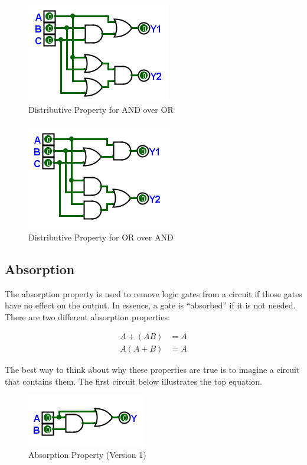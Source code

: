 \begin{figure}[H]
	\centering
	\includegraphics[width=\maxwidth{.95\linewidth}]{gfx/04_23}
	\caption{Distributive Property for AND over OR}
	\label{fig:04_23}
\end{figure}

\begin{figure}[H]
	\centering
	\includegraphics[width=\maxwidth{.95\linewidth}]{gfx/04_24}
	\caption{Distributive Property for OR over AND}
	\label{fig:04_24}
\end{figure}

\subsection{Absorption}
\label{BF:subsec:absorption_property}

The absorption property is used to remove logic gates from a circuit if those gates have no effect on the output. In essence, a gate is ``absorbed'' if it is not needed. There are two different absorption properties:

\begin{align}
  \label{BF:eq:absorption}
  A + (AB) &= A \\
  \nonumber
  A(A + B) &= A
\end{align}

The best way to think about why these properties are true is to imagine a circuit that contains them. The first circuit below illustrates the top equation. 

\begin{figure}[H]
	\centering
	\includegraphics[width=\maxwidth{.95\linewidth}]{gfx/04_25}
	\caption{Absorption Property (Version 1)}
	\label{fig:04_25}
\end{figure}

